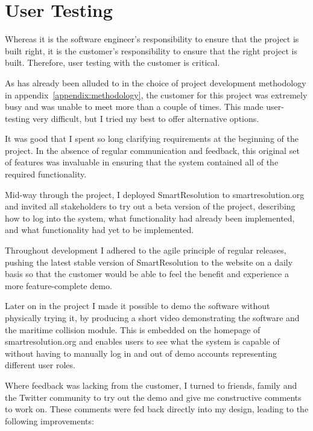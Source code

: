 \section{User Testing}

Whereas it is the software engineer's responsibility to ensure that the project is built right, it is the customer's responsibility to ensure that the right project is built. Therefore, user testing with the customer is critical.

As has already been alluded to in the choice of project development methodology in appendix~\ref{appendix:methodology}, the customer for this project was extremely busy and was unable to meet more than a couple of times. This made user-testing very difficult, but I tried my best to offer alternative options.

It was good that I spent so long clarifying requirements at the beginning of the project. In the absence of regular communication and feedback, this original set of features was invaluable in ensuring that the system contained all of the required functionality.

Mid-way through the project, I deployed SmartResolution to smartresolution.org and invited all stakeholders to try out a beta version of the project, describing how to log into the system, what functionality had already been implemented, and what functionality had yet to be implemented.

Throughout development I adhered to the agile principle of regular releases, pushing the latest stable version of SmartResolution to the website on a daily basis so that the customer would be able to feel the benefit and experience a more feature-complete demo.

Later on in the project I made it possible to demo the software without physically trying it, by producing a short video demonstrating the software and the maritime collision module. This is embedded on the homepage of smartresolution.org and enables users to see what the system is capable of without having to manually log in and out of demo accounts representing different user roles.

Where feedback was lacking from the customer, I turned to friends, family and the Twitter community to try out the demo and give me constructive comments to work on. These comments were fed back directly into my design, leading to the following improvements:

